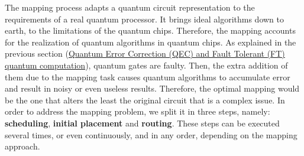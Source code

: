 The mapping process adapts a quantum circuit representation to the requirements of a real quantum processor.
It brings ideal algorithms down to earth, to the limitations of the quantum chips.
Therefore, the mapping accounts for the realization of quantum algorithms in quantum chips.
As explained in the previous section (\hyperref[sec:org919a89e]{Quantum Error Correction (QEC) and Fault Tolerant (FT) quantum computation}), quantum gates are faulty.
Then, the extra addition of them due to the mapping task causes quantum algorithms to accumulate error and result in noisy or even useless results.
Therefore, the optimal mapping would be the one that alters the least the original circuit that is a complex issue.
In order to address the mapping problem, we split it in three steps, namely: \textbf{scheduling}, \textbf{initial placement} and \textbf{routing}.
These steps can be executed several times, or even continuously, and in any order, depending on the mapping approach.

